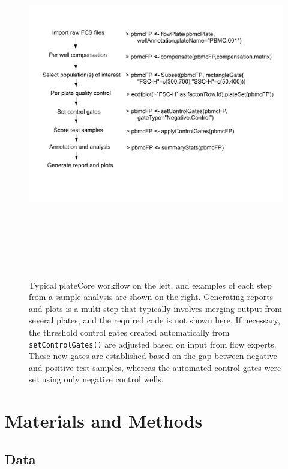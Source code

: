 \documentclass[12pt]{article}
\newcommand{\Rfunction}[1]{{\texttt{#1()}}}
\begin{document}
\begin{figure}
\centering
\includegraphics[width=7in,height=6in]{analysisSteps.pdf}
\caption{Typical plateCore workflow on the left, and examples of each step from a sample analysis are shown on the right.
Generating reports and plots is a multi-step that typically involves merging output from several plates, and the required
code is not shown here.
If necessary, the threshold control gates created automatically from \Rfunction{setControlGates} are adjusted based on input from flow experts. 
These new gates are established based on the gap between negative and positive test samples, whereas the automated
control gates were set using only negative control wells.}
\label{fig:analysis}
\end{figure}
 
\clearpage
\section*{Materials and Methods}
\subsection*{Data}
\end{document}
